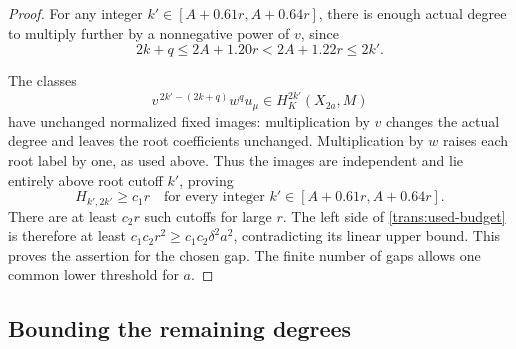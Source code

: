 \begin{proof}
For any integer $k'\in[A+0.61r,A+0.64r]$, there is enough actual
degree to multiply further by a nonnegative power of $v$, since
\begin{equation}\label{trans:degree-room}
 2k+q\le2A+1.20r<2A+1.22r\le2k'.
\end{equation}

The classes
\[
 v^{\,2k'-(2k+q)}w^q u_\mu
       \in H_K^{2k'}(X_{2a},M)
\]
have unchanged normalized fixed images: multiplication by $v$ changes
the actual degree and leaves the root coefficients unchanged.
Multiplication by $w$ raises each root label by one, as used above.
Thus the images are independent and lie entirely above root cutoff
$k'$, proving
\[
 H_{k',2k'}\ge c_1r
 \quad\text{for every integer }k'\in[A+0.61r,A+0.64r].
\]
There are at least $c_2r$ such cutoffs for large $r$.  The left side of
\eqref{trans:used-budget} is therefore at least
$c_1c_2r^2\ge c_1c_2\delta^2a^2$, contradicting its linear upper bound.
This proves the assertion for the chosen gap.  The finite number of
gaps allows one common lower threshold for $a$.
\end{proof}

\subsection{Bounding the remaining degrees}

